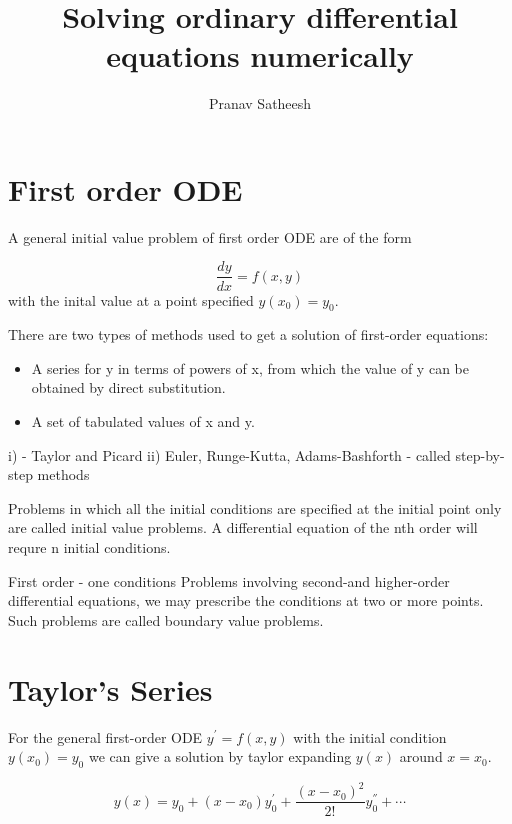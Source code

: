 \documentclass[10pt,a4paper]{article}
\author{Pranav Satheesh}
\title{Solving ordinary differential equations numerically}
\begin{document}
\maketitle


\section{First order ODE}

A general initial value problem of first order ODE are of the form 

\begin{equation}
    \frac{dy}{dx} = f(x,y)
    \label{eq:ODE}
\end{equation} with the inital value at a point specified $y(x_0) = y_0$.




There are two types of methods used to get a solution of first-order equations:

\begin{itemize}
    \item  A series for y in terms of powers of x, from which the value of y
    can be obtained by direct substitution.
    \item   A set of tabulated values of x and y.   
\end{itemize}

i) - Taylor and Picard
ii) Euler, Runge-Kutta, Adams-Bashforth  - called step-by-step methods


Problems in which all the initial conditions are specified at the initial point only are called
initial value problems. A differential equation of the nth order will requre n initial conditions.

First order - one conditions
Problems involving second-and higher-order differential equations, we may prescribe the conditions at two
or more points. Such problems are called boundary value problems.


\section{Taylor's Series}

For the general first-order ODE $y^{'} = f(x,y)$ with the initial condition 
$y(x_0) = y_0$ we can give a solution by taylor expanding $y(x)$ around $x = x_0$.

\begin{equation}
    y(x) = y_0 + (x - x_0) y^{'}_{0} + \frac{(x-x_{0})^2}{2!} y^{''}_{0} + \cdots
    \label{eq:Taylor}
\end{equation}
\end{document}
